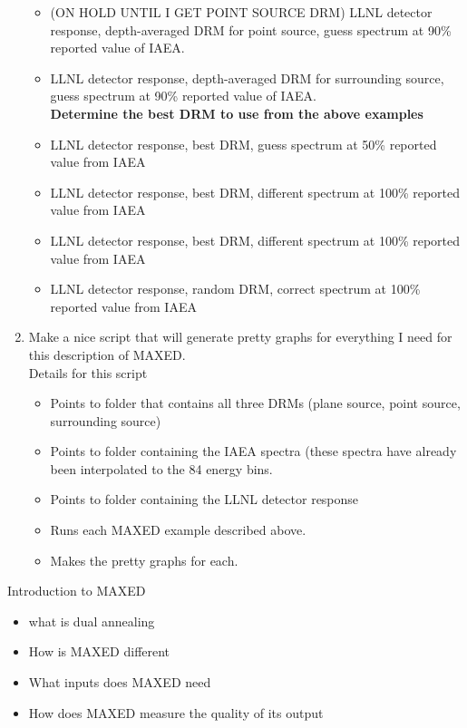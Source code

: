 \documentclass[11pt]{article}
\begin{document}
\begin{enumerate}
\begin{itemize}
	\item (ON HOLD UNTIL I GET POINT SOURCE DRM) LLNL detector response, depth-averaged DRM for point source, guess spectrum at 90\% reported value of IAEA.
	\item [\checkmark] LLNL detector response, depth-averaged DRM for surrounding source, guess spectrum at 90\% reported value of IAEA.\\
	\textbf{Determine the best DRM to use from the above examples}
	\item LLNL detector response, best DRM, guess spectrum at 50\% reported value from IAEA
	\item LLNL detector response, best DRM, different spectrum at 100\% reported value from IAEA
	\item LLNL detector response, best DRM, different spectrum at 100\% reported value from IAEA
	\item LLNL detector response, random DRM, correct spectrum at 100\% reported value from IAEA
	
	\end{itemize}
\item Make a nice script that will generate pretty graphs for everything I need for this description of MAXED.\\
Details for this script
	\begin{itemize}
	\item Points to folder that contains all three DRMs (plane source, point source, surrounding source)
	\item Points to folder containing the IAEA spectra (these spectra have already been interpolated to the 84 energy bins.
	\item Points to folder containing the LLNL detector response
	\item Runs each MAXED example described above.
	\item Makes the pretty graphs for each.
	\end{itemize}

\end{enumerate}
\break


Introduction to MAXED
\begin{itemize}
   \item what is dual annealing
   \item How is MAXED different
   \item What inputs does MAXED need
   \item How does MAXED measure the quality of its output
\end{itemize}
\end{document}
